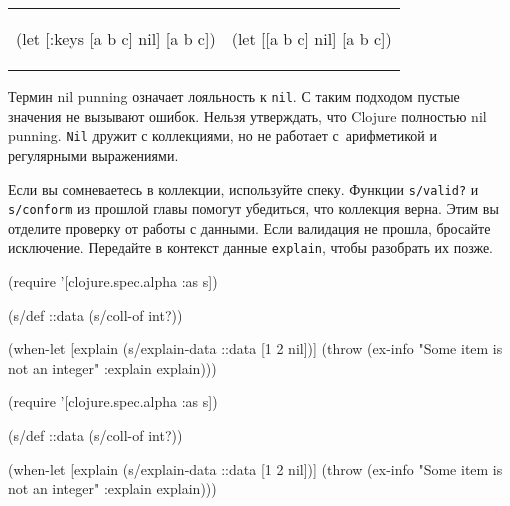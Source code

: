 \else

\begin{english}
\noindent
\begin{tabular}{ @{}p{5cm} @{}p{5cm} }

  \begin{clojure}
(let [{:keys [a b c]} nil]
  [a b c])
  \end{clojure}

&

  \begin{clojure}
(let [[a b c] nil]
  [a b c])
  \end{clojure}

\end{tabular}

\end{english}

\fi


Термин nil punning означает лояльность к \verb|nil|. С таким подходом
пустые значения не вызывают ошибок. Нельзя утверждать, что Clojure полностью
nil punning. \verb|Nil| дружит с коллекциями, но не работает с~арифметикой
и регулярными выражениями.


Если вы сомневаетесь в коллекции, используйте спеку. Функции \verb|s/valid?| и
\verb|s/conform| из прошлой главы  помогут убедиться, что
коллекция верна. Этим вы отделите проверку от работы с данными. Если валидация
не прошла, бросайте исключение. Передайте в контекст данные \verb|explain|,
чтобы разобрать их позже.

\ifx\devicetype\mobile

\begin{english}
  \begin{clojure}
(require '[clojure.spec.alpha :as s])

(s/def ::data (s/coll-of int?))

(when-let [explain (s/explain-data
                     ::data
                     [1 2 nil])]
  (throw (ex-info
           "Some item is not an integer"
           {:explain explain})))
  \end{clojure}
\end{english}

\else

\begin{english}
  \begin{clojure}
(require '[clojure.spec.alpha :as s])

(s/def ::data (s/coll-of int?))

(when-let [explain (s/explain-data ::data [1 2 nil])]
  (throw (ex-info "Some item is not an integer"
                  {:explain explain})))
  \end{clojure}
\end{english}

